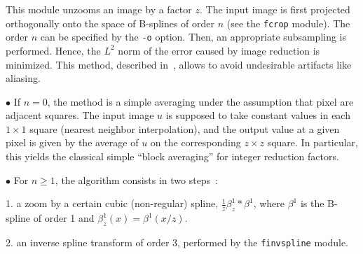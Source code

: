 This module unzooms an image by a factor $z$. The input image is first
projected orthogonally onto the space of B-splines of order $n$ (see
the \verb+fcrop+ module). The order $n$ can be specified 
by the \verb+-o+ option. Then, an appropriate subsampling is performed.
Hence, the $L^2$ norm of the error caused by image reduction is minimized.
This method, described in~\cite{unser.aldroubi.ea:enlargement}, allows to 
avoid undesirable artifacts like aliasing. 

\medskip

$\bullet$ 
If $n=0$, the method is a simple averaging under the assumption that pixel
are adjacent squares. The input image $u$ is supposed to take constant values
in each $1\times 1$ square (nearest neighbor interpolation), and the output
value at a given pixel is given by the average of $u$ on the corresponding
$z\times z$ square. In particular, this yields the classical simple 
``block averaging'' for integer reduction factors.

\medskip

$\bullet$ 
For $n\geq 1$, the algorithm consists in two steps~:

1. a zoom by a certain cubic (non-regular) spline, 
$\frac 1z \beta^1_z * \beta^1$, where $\beta^1$ is the 
B-spline of order 1 and $\beta^1_z(x)=\beta^1(x/z)$.

2. an inverse spline transform of order 3, performed by the
\verb+finvspline+ module.

